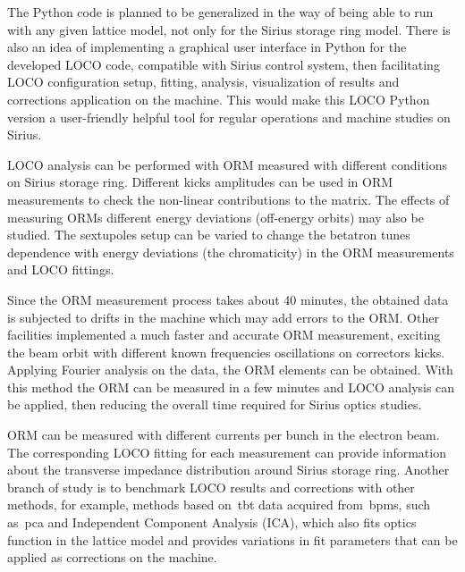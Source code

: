 The Python code is planned to be generalized in the way of being able to run with any given lattice model, not only for the Sirius storage ring model. There is also an idea of implementing a graphical user interface in Python for the developed LOCO code, compatible with Sirius control system, then facilitating LOCO configuration setup, fitting, analysis, visualization of results and corrections application on the machine. This would make this LOCO Python version a user-friendly helpful tool for regular operations and machine studies on Sirius. 

LOCO analysis can be performed with ORM measured with different conditions on Sirius storage ring. Different kicks amplitudes can be used in ORM measurements to check the non-linear contributions to the matrix. The effects of measuring ORMs different energy deviations (off-energy orbits) may also be studied. The sextupoles setup can be varied to change the betatron tunes dependence with energy deviations (the chromaticity) in the ORM measurements and LOCO fittings.

Since the ORM measurement process takes about 40 minutes, the obtained data is subjected to drifts in the machine which may add errors to the ORM. Other facilities implemented a much faster and accurate ORM measurement, exciting the beam orbit with different known frequencies oscillations on correctors kicks. Applying Fourier analysis on the data, the ORM elements can be obtained. With this method the ORM can be measured in a few minutes and LOCO analysis can be applied, then reducing the overall time required for Sirius optics studies.

ORM can be measured with different currents per bunch in the electron beam. The corresponding LOCO fitting for each measurement can provide information about the transverse impedance distribution around Sirius storage ring.  
Another branch of study is to benchmark LOCO results and corrections with other methods, for example, methods based on~\gls{tbt} data acquired from~\glspl{bpm}, such as~\gls{pca} and Independent Component Analysis (ICA), which also fits optics function in the lattice model and provides variations in fit parameters that can be applied as corrections on the machine.